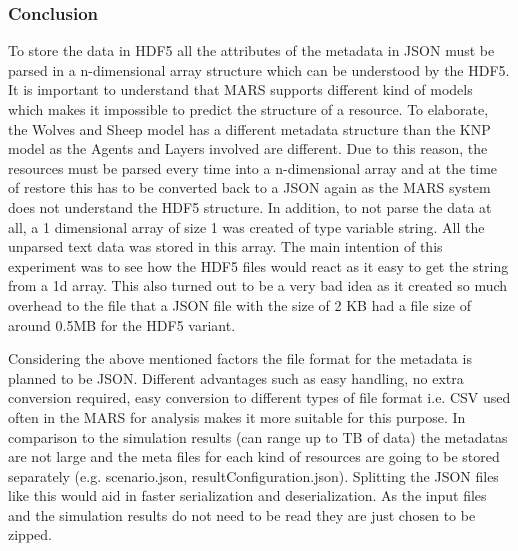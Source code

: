 \subsubsection{Conclusion}
    To store the data in HDF5 all the attributes of the metadata in JSON must be parsed in a n-dimensional array structure which can be understood by the HDF5. 
    It is important to understand that MARS supports different kind of models which makes it impossible to predict the structure of a resource. To elaborate, the
    Wolves and Sheep \cite{HAWHamburgMARS} model has a different metadata structure than the KNP \cite{HAWHamburgMARS} model as the Agents and Layers involved are 
    different. Due to this reason, the resources
    must be parsed every time into a n-dimensional array and at the time of restore this has to be converted back to a JSON again as the MARS system
    does not understand the HDF5 structure. In addition, to not parse the data at all, a 1 dimensional array of size 1 was created of type variable string. All the unparsed text data
    was stored in this array. The main intention of this experiment was to see how the HDF5 files would react as it easy to get the string from a 1d array.
    This also turned out to be a very bad idea as it created so much overhead to the file that a JSON file with the size of 2 KB
    had a file size of around 0.5MB for the HDF5 variant. 
    
    Considering the above mentioned factors the file format for the metadata is planned to be JSON. Different advantages such as easy handling, no extra conversion
    required, easy conversion to different types of file format i.e. CSV used often in the MARS for analysis makes it more suitable for this purpose. 
    In comparison to the simulation results (can range up to TB of data) the metadatas are not large and the meta files for each kind of resources
    are going to be stored separately (e.g. scenario.json, resultConfiguration.json). Splitting the JSON files like this would aid in faster serialization and 
    deserialization. As the input files and the simulation results do not need to be read they are just chosen to be zipped.
 

